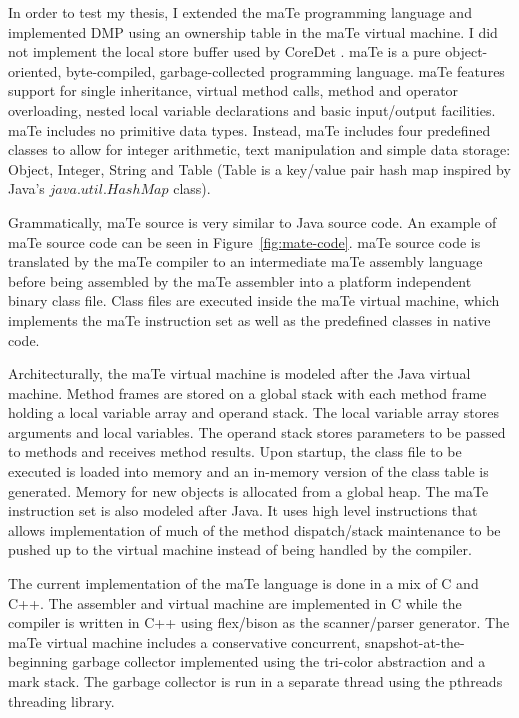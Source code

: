 In order to test my thesis, I extended the maTe programming language
and implemented DMP using an ownership table in the maTe virtual
machine.  I did not implement the local store buffer used by CoreDet
\cite{coredet}.  maTe is a pure object-oriented, byte-compiled,
garbage-collected programming language.  maTe features support for
single inheritance, virtual method calls, method and operator
overloading, nested local variable declarations and basic input/output
facilities.  maTe includes no primitive data types.  Instead, maTe
includes four predefined classes to allow for integer arithmetic, text
manipulation and simple data storage: Object, Integer, String and
Table (Table is a key/value pair hash map inspired by Java's
$java.util.HashMap$ class).

Grammatically, maTe source is very similar to Java source code.  An
example of maTe source code can be seen in Figure~\ref{fig:mate-code}.
maTe source code is translated by the maTe compiler to an intermediate
maTe assembly language before being assembled by the maTe assembler
into a platform independent binary class file.  Class files are
executed inside the maTe virtual machine, which implements the maTe
instruction set as well as the predefined classes in native code.

Architecturally, the maTe virtual machine is modeled after the Java
virtual machine.  Method frames are stored on a global stack with each
method frame holding a local variable array and operand stack.  The
local variable array stores arguments and local variables.  The
operand stack stores parameters to be passed to methods and receives
method results.  Upon startup, the class file to be executed is loaded
into memory and an in-memory version of the class table is generated.
Memory for new objects is allocated from a global heap.  The maTe
instruction set is also modeled after Java.  It uses high level
instructions that allows implementation of much of the method
dispatch/stack maintenance to be pushed up to the virtual machine
instead of being handled by the compiler.

The current implementation of the maTe language is done in a mix of C
and C++.  The assembler and virtual machine are implemented in C while
the compiler is written in C++ using flex/bison as the scanner/parser
generator.  The maTe virtual machine includes a conservative
concurrent, snapshot-at-the-beginning garbage collector implemented
using the tri-color abstraction and a mark stack.  The garbage
collector is run in a separate thread using the pthreads threading
library.

